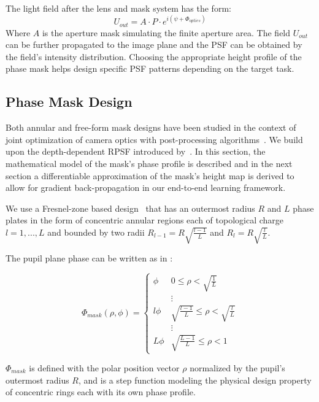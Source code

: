 \documentclass[preprint,5p,twocolumn]{elsarticle}
\begin{document}
The  light field after the lens and mask system has the form:
\begin{equation}
    U_{out}=A\cdot P \cdot e^{i(\psi+\Phi_{optics})}
\end{equation}
Where $A$ is the aperture mask simulating the finite aperture area. The field $U_{out}$ can be further propagated to the image plane and the PSF can be obtained by the field's intensity distribution. 
Choosing the appropriate height profile of the phase mask helps design specific PSF patterns depending on the target task.
\subsection{Phase Mask Design}
\label{subsec:mask_design}


Both annular and free-form mask designs have been studied in the context of joint optimization of camera optics with post-processing algorithms~\cite{haim2018depth,wu2019phasecam3d,chang2019deep}. We build upon the depth-dependent RPSF introduced by~\cite{prasad2013rotating}. In this section, the mathematical model of the mask's phase profile is described and in the next section a differentiable approximation of the mask's height map is derived to allow for gradient back-propagation in our end-to-end learning framework.

We use a Fresnel-zone based design~\cite{prasad2013rotating} that has an outermost radius $R$ and $L$ phase plates in the form of concentric annular regions each of topological charge $l=1,...,L$ and bounded by two radii $R_{l-1}=R\sqrt{\frac{l-1}{L}}$ and $R_{l}=R\sqrt{\frac{l}{L}}$.

The pupil plane phase can be written as in \cite{prasad2013rotating}:

\begin{equation}
\label{4}
    \Phi_{mask}(\rho,\phi) = \begin{cases}
     \phi & 0 \leq \rho < \sqrt{\frac{1}{L}}\\
      & \vdots \\
     l\phi & \sqrt{\frac{l-1}{L}} \leq \rho < \sqrt{\frac{l}{L}}\\
      & \vdots \\
     L\phi & \sqrt{\frac{L-1}{L}} \leq \rho < 1
    \end{cases}
\end{equation}

$\Phi_{mask}$ is defined with the polar position vector $\rho$ normalized by the pupil's outermost radius $R$, and is a step function modeling the physical design property of concentric rings each  with its own phase profile. 
\end{document}

